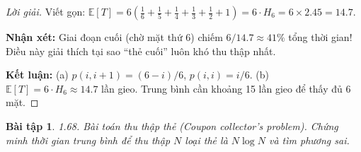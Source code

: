 \documentclass[8pt,a4paper]{article}
\newtheorem{exercise}{Bài tập}
\newenvironment{solution}{\begin{proof}[Lời giải]}{\end{proof}}
\newcommand{\E}{\mathbb{E}}
\begin{document}
\begin{solution}
Viết gọn: $\E[T] = 6\left(\frac{1}{6} + \frac{1}{5} + \frac{1}{4} + \frac{1}{3} + \frac{1}{2} + 1\right) = 6 \cdot H_6 = 6 \times 2.45 = 14.7$.

\textbf{Nhận xét:} Giai đoạn cuối (chờ mặt thứ 6) chiếm $6/14.7 \approx 41\%$ tổng thời gian! Điều này giải thích tại sao ``thẻ cuối'' luôn khó thu thập nhất.

\textbf{Kết luận:} (a) $p(i, i+1) = (6-i)/6$, $p(i, i) = i/6$. (b) $\E[T] = 6 \cdot H_6 \approx 14.7$ lần gieo. Trung bình cần khoảng 15 lần gieo để thấy đủ 6 mặt.
\end{solution}

\begin{exercise}
1.68. Bài toán thu thập thẻ (Coupon collector’s problem). Chứng minh thời gian trung bình để thu thập $N$ loại thẻ là $N \log N$ và tìm phương sai.
\end{exercise}
\end{document}
